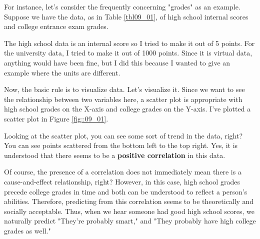 \documentclass{ltjbook}
\begin{document}
For instance, let's consider the frequently concerning "grades" as an example. Suppose we have the data, as in Table \ref{tbl09_01}, of high school internal scores and college entrance exam grades.



The high school data is an internal score so I tried to make it out of 5 points. For the university data, I tried to make it out of 1000 points. Since it is virtual data, anything would have been fine, but I did this because I wanted to give an example where the units are different.

Now, the basic rule is to visualize data. Let's visualize it. Since we want to see the relationship between two variables here, a scatter plot is appropriate with high school grades on the X-axis and college grades on the Y-axis. I've plotted a scatter plot in Figure \ref{fig::09_01}.


Looking at the scatter plot, you can see some sort of trend in the data, right? You can see points scattered from the bottom left to the top right.
Yes, it is understood that there seems to be a \textbf{positive correlation} in this data.

Of course, the presence of a correlation does not immediately mean there is a cause-and-effect relationship, right? However, in this case, high school grades precede college grades in time and both can be understood to reflect a person's abilities. Therefore, predicting from this correlation seems to be theoretically and socially acceptable. Thus, when we hear someone had good high school scores, we naturally predict "They're probably smart," and "They probably have high college grades as well."
\end{document}
